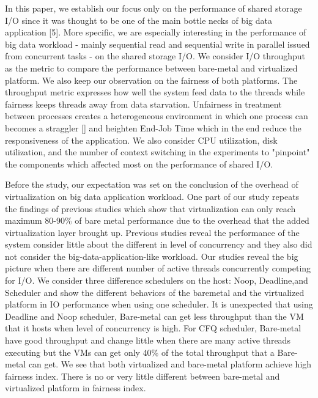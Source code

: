 \documentclass{acmsig}
\begin{document}
In this paper, we establish our focus only on the performance of shared storage I/O since it was thought to be one of the main bottle necks of big data application [5]. More specific, we are especially interesting in the performance of big data workload - mainly sequential read and sequential write in parallel issued from concurrent tasks - on the shared storage I/O. We consider I/O throughput as the metric to compare the performance between bare-metal and virtualized platform. We also keep our observation on the fairness of both platforms. The throughput metric expresses how well the system feed data to the threads while fairness keeps threads away from data starvation. Unfairness in treatment between processes creates a heterogeneous environment in which one process can becomes a straggler [\cite{matei08}] and heighten End-Job Time which in the end reduce the responsiveness of the application. We also consider CPU utilization, disk utilization, and the number of context switching in the experiments to "pinpoint" the components which affected most on the performance of shared I/O.

Before the study, our expectation was set on the conclusion of the overhead of virtualization on big data application workload. One part of our study repeats the findings of previous studies which show that virtualization can only reach maximum 80-90\% of bare metal performance due to the overhead that the added virtualization layer brought up. Previous studies reveal the performance of the system consider little about the different in level of concurrency and they also did not consider the big-data-application-like workload. Our studies reveal the big picture when there are different number of active threads concurrently competing for I/O. We consider three difference schedulers on the host: Noop, Deadline,and Scheduler and show the different behaviors of the baremetal and the virtualized platform in IO performance when using one scheduler. It is unexpected that using Deadline and Noop scheduler, Bare-metal can get less throughput than the VM that it hosts when level of concurrency is high. For CFQ scheduler, Bare-metal have good throughput and change little when there are many active threads executing but the VMs can get only 40\% of the total throughput that a Bare-metal can get. We see that both virtualized and bare-metal platform achieve high fairness index. There is no or very little different between bare-metal and virtualized platform in fairness index.
\end{document}
